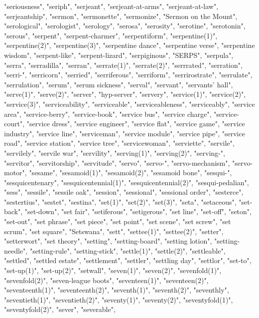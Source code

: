 "seriousness",
"seriph",
"serjeant",
"serjeant-at-arms",
"serjeant-at-law",
"serjeantship",
"sermon",
"sermonette",
"sermonize",
"Sermon on the Mount",
"serological",
"serologist",
"serology",
"serosa",
"serosity",
"serotine",
"serotonin",
"serous",
"serpent",
"serpent-charmer",
"serpentiform",
"serpentine(1)",
"serpentine(2)",
"serpentine(3)",
"serpentine dance",
"serpentine verse",
"serpentine wisdom",
"serpent-like",
"serpent-lizard",
"serpiginous",
"SERPS",
"serpula",
"serra",
"serradilla",
"serran",
"serrate(1)",
"serrate(2)",
"serrrated",
"serration",
"serri-",
"serricorn",
"serried",
"serriferous",
"serriform",
"serrirostrate",
"serrulate",
"serrulation",
"serum",
"serum sickness",
"serval",
"servant",
"servants' hall",
"serve(1)",
"serve(2)",
"server",
"hyp-server",
"servery",
"service(1)",
"service(2)",
"service(3)",
"serviceability",
"serviceable",
"serviceableness",
"serviceably",
"service area",
"service-berry",
"service-book",
"service bus",
"service charge",
"service-court",
"service dress",
"service engineer",
"service flat",
"service game",
"service industry",
"service line",
"serviceman",
"service module",
"service pipe",
"service road",
"service station",
"service tree",
"servicewoman",
"serviette",
"servile",
"servilely",
"servile war",
"servility",
"serving(1)",
"serving(2)",
"serving-",
"servitor",
"servitorship",
"servitude",
"servo",
"servo-",
"servo-mechanism",
"servo-motor",
"sesame",
"sesamoid(1)",
"sesamoid(2)",
"sesamoid bone",
"sesqui-",
"sesquicentenary",
"sesquicentennial(1)",
"sesquicentennial(2)",
"sesqui-pedalian",
"sess",
"sessile",
"sessile oak",
"session",
"sessional",
"sessional order",
"sesterce",
"sestertius",
"sestet",
"sestina",
"set(1)",
"set(2)",
"set(3)",
"seta",
"setaceous",
"set-back",
"set-down",
"set fair",
"setiferous",
"setigerous",
"set line",
"set-off",
"seton",
"set-out",
"set phrase",
"set piece",
"set point",
"set scene",
"set screw",
"set scrum",
"set square",
"Setswana",
"sett",
"settee(1)",
"settee(2)",
"setter",
"setterwort",
"set theory",
"setting",
"setting-board",
"setting lotion",
"setting-needle",
"setting-rule",
"setting-stick",
"settle(1)",
"settle(2)",
"settleable",
"settled",
"settled estate",
"settlement",
"settler",
"settling day",
"settlor",
"set-to",
"set-up(1)",
"set-up(2)",
"setwall",
"seven(1)",
"seven(2)",
"sevenfold(1)",
"sevenfold(2)",
"seven-league boots",
"seventeen(1)",
"seventeen(2)",
"seventeenth(1)",
"seventeenth(2)",
"seventh(1)",
"seventh(2)",
"seventhly",
"seventieth(1)",
"seventieth(2)",
"seventy(1)",
"seventy(2)",
"seventyfold(1)",
"seventyfold(2)",
"sever",
"severable",
